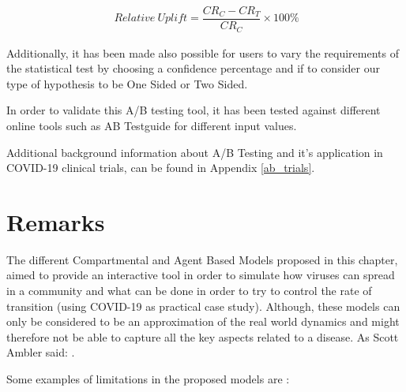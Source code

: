\useshortskip
\begin{align}
\ Relative\:Uplift = \dfrac{CR_{C} - CR_{T}}{CR_{C}}\times100\%
\label{uplift}
\end{align}
\useshortskip

Additionally, it has been made also possible for users to vary the requirements of the statistical test by choosing a confidence percentage and if to consider our type of hypothesis to be One Sided or Two Sided. 

In order to validate this A/B testing tool, it has been tested against different online tools such as AB Testguide \cite{check_live} for different input values.

Additional background information about A/B Testing and it's application in COVID-19 clinical trials, can be found in Appendix \ref{ab_trials}.

\section{Remarks}
The different Compartmental and Agent Based Models proposed in this chapter, aimed to provide an interactive tool in order to simulate how viruses can spread in a community and what can be done in order to try to control the rate of transition (using COVID-19 as practical case study). Although, these models can only be considered to be an approximation of the real world dynamics and might therefore not be able to capture all the key aspects related to a disease. As Scott Ambler \cite{scott} said: .

Some examples of limitations in the proposed models are \cite{sri_ex}:

